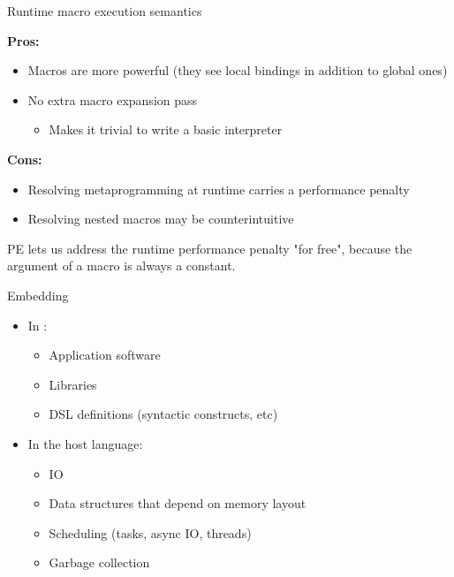 \begin{frame}[fragile]{Runtime macro execution semantics}
  \begin{minipage}[t]{0.48\textwidth}
    \textbf{Pros:}

    \begin{itemize}
      \item Macros are more powerful (they see local bindings
      in addition to global ones)
      \item No extra macro expansion pass
      \begin{itemize}
        \item Makes it trivial to write a basic interpreter
      \end{itemize}
    \end{itemize}
  \end{minipage}
  \begin{minipage}[t]{0.48\textwidth}
    \textbf{Cons:}

    \begin{itemize}
      \item Resolving metaprogramming at runtime carries
      a performance penalty
      \item Resolving nested macros may be counterintuitive
    \end{itemize}
  \end{minipage}

  \vspace{2em}

  PE lets us address the runtime performance penalty "for free",
  because the argument of a macro is always a constant.
\end{frame}

\begin{frame}[fragile]{Embedding}
\begin{itemize}
    \item In \lang:
        \begin{itemize}
            \item Application software
            \item Libraries
            \item DSL definitions (syntactic constructs, etc)
        \end{itemize}
    \item In the host language:
        \begin{itemize}
            \item IO
            \item Data structures that depend on memory layout
            \item Scheduling (tasks, async IO, threads)
            \item Garbage collection
        \end{itemize}
\end{itemize}
\end{frame}

